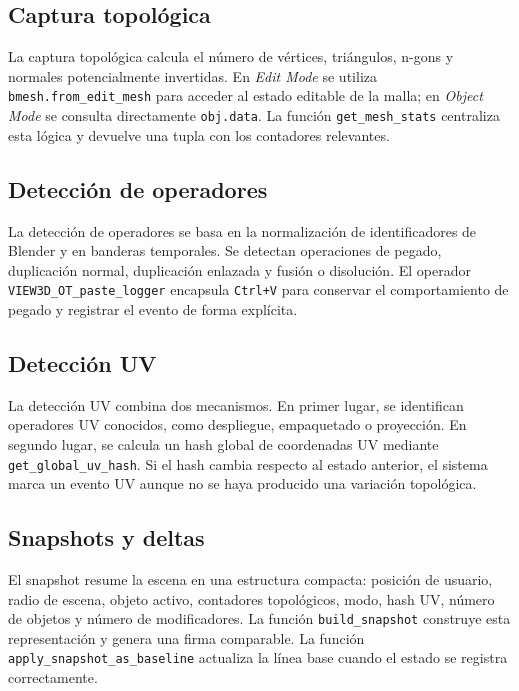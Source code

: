 \subsection{Captura topológica}
\label{subsec:d-logger-topologica}

La captura topológica calcula el número de vértices, triángulos, n-gons y normales potencialmente invertidas. En \textit{Edit Mode} se utiliza 
\texttt{bmesh.from\_edit\_mesh} para acceder al estado editable de la malla; en \textit{Object Mode} se consulta directamente \texttt{obj.data}. La función \texttt{get\_mesh\_stats} centraliza esta lógica y devuelve una tupla con los contadores relevantes.

\subsection{Detección de operadores}
\label{subsec:d-logger-operadores}

La detección de operadores se basa en la normalización de identificadores de Blender y en banderas temporales. Se detectan operaciones de pegado, duplicación normal, duplicación enlazada y fusión o disolución. El operador \texttt{VIEW3D\_OT\_paste\_logger} encapsula \texttt{Ctrl+V} para conservar el comportamiento de pegado y registrar el evento de forma explícita.

\subsection{Detección UV}
\label{subsec:d-logger-uv}

La detección UV combina dos mecanismos. En primer lugar, se identifican operadores UV conocidos, como despliegue, empaquetado o proyección. En segundo lugar, se calcula un hash global de coordenadas UV mediante \texttt{get\_global\_uv\_hash}. Si el hash cambia respecto al estado anterior, el sistema marca un evento UV aunque no se haya producido una variación topológica.

\subsection{Snapshots y deltas}
\label{subsec:d-logger-snapshots}

El snapshot resume la escena en una estructura compacta: posición de usuario, radio de escena, objeto activo, contadores topológicos, modo, hash UV, número de objetos y número de modificadores. La función \texttt{build\_snapshot} construye esta representación y genera una firma comparable. La función \texttt{apply\_snapshot\_as\_baseline} actualiza la línea base cuando el estado se registra correctamente.

